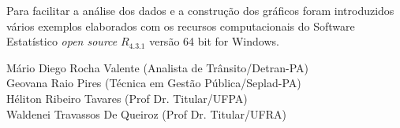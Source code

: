 Para facilitar a análise dos dados e a construção dos gráficos foram introduzidos vários exemplos elaborados com os recursos computacionais do Software Estatístico \textit{open source} \textbf{$R_{4.3.1}$} versão 64 bit for Windows. 
\vst






\vst
\vst
\vst

\begin{centering}

\vst

\vsm

Mário Diego Rocha Valente (Analista de Trânsito/Detran-PA) \\
Geovana Raio Pires (Técnica em Gestão Pública/Seplad-PA)\\
Héliton Ribeiro Tavares (Prof Dr. Titular/UFPA)\\
Waldenei Travassos De Queiroz (Prof Dr. Titular/UFRA)\\



\end{centering}
